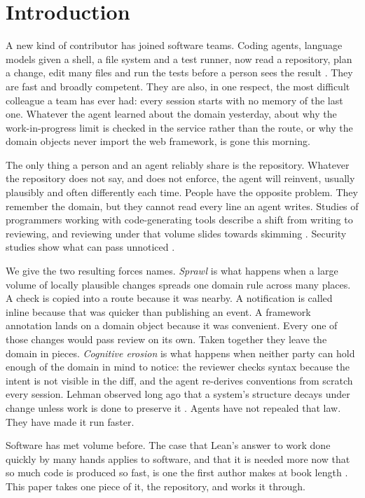 \section{Introduction}\label{sec:intro}

A new kind of contributor has joined software teams. Coding agents, language models given a
shell, a file system and a test runner, now read a repository, plan a change, edit many files
and run the tests before a person sees the result
\citep{chen2021codex,jimenez2024swebench,yang2024sweagent}. They are fast and broadly competent.
They are also, in one respect, the most difficult colleague a team has ever had: every session
starts with no memory of the last one. Whatever the agent learned about the domain yesterday,
about why the work-in-progress limit is checked in the service rather than the route, or why the
domain objects never import the web framework, is gone this morning.

The only thing a person and an agent reliably share is the repository. Whatever the repository
does not say, and does not enforce, the agent will reinvent, usually plausibly and often
differently each time. People have the opposite problem. They remember the domain, but they
cannot read every line an agent writes. Studies of programmers working with code-generating
tools describe a shift from writing to reviewing, and reviewing under that volume slides
towards skimming \citep{vaithilingam2022expectation,barke2023grounded}. Security studies show
what can pass unnoticed \citep{pearce2022asleep,perry2023insecure}.

We give the two resulting forces names. \emph{Sprawl} is what happens when a large volume of
locally plausible changes spreads one domain rule across many places. A check is copied into a
route because it was nearby. A notification is called inline because that was quicker than
publishing an event. A framework annotation lands on a domain object because it was convenient.
Every one of those changes would pass review on its own. Taken together they leave the domain
in pieces. \emph{Cognitive erosion} is what happens when neither party can hold enough of the
domain in mind to notice: the reviewer checks syntax because the intent is not visible in the
diff, and the agent re-derives conventions from scratch every session. Lehman observed long ago
that a system's structure decays under change unless work is done to preserve it
\citep{lehman1980laws}. Agents have not repealed that law. They have made it run faster.

Software has met volume before. The case that Lean's answer to work done quickly by many hands
applies to software, and that it is needed more now that so much code is produced so fast, is
one the first author makes at book length \citep{griffin2026build}. This paper takes one piece
of it, the repository, and works it through.

